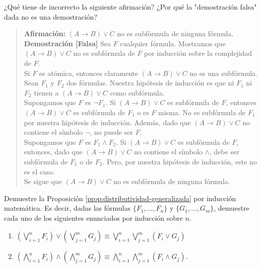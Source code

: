 \message{ !name(main.tex)}\documentclass[12pt,a4paper]{book}
\newcommand{\comillas}[1]{"#1"}
\begin{document}
    \begin{ejercicio}
        ¿Qué tiene de incorrecto la siguiente afirmación? ¿Por qué la \comillas{demostración falsa} dada no es una
        demostración?
        \begin{quote}
            \textbf{Afirmación:} $(A\rightarrow B)\vee C$ no es subfórmula de ninguna fórmula.\\[0.2cm]
            \textbf{Demostración [Falsa]} Sea $F$ cualquier fórmula. Mostramos que $(A\rightarrow B)\vee C$ no es
            subfórmula de $F$ por inducción sobre la complejidad de $F$.\\
            Si $F$ es atómica, entonces claramente $(A\rightarrow B)\vee C$ no es una subfórmula.\\
            Sean $F_{1}$ y $F_{2}$ dos fórmulas. Nuestra hipótesis de inducción es que ni $F_{1}$ ni $F_{2}$ tienen a
            $(A\rightarrow B)\vee C$ como subfórmula.\\
            Supongamos que $F$ es $\neg F_{1}$. Si $(A\rightarrow B)\vee C$ es subfórmula de $F$, entonces
            $(A\rightarrow B)\vee C$ es subfórmula de $F_{1}$ o es $F$ misma. No es subfórmula de $F_{1}$ por nuestra
            hipótesis de inducción. Además, dado que $(A\rightarrow B)\vee C$ no contiene el símbolo $\neg$, no puede ser
            $F$.\\
            Supongamos que $F$ es $F_{1}\wedge F_{2}$. Si $(A\rightarrow B)\vee C$ es subfórmula de $F$, entonces, dado que
            $(A\rightarrow B)\vee C$ no contiene el símbolo $\wedge$, debe ser subfórmula de $F_{1}$ o de $F_{2}$. Pero, por
            nuestra hipótesis de inducción, este no es el caso.\\
            Se sigue que $(A\rightarrow B)\vee C$ no es subfórmula de ninguna fórmula.
        \end{quote}
    \end{ejercicio}

    \begin{ejercicio}\label{ej:prop-distributividad-generalizada}
        Demuestre la Proposición \ref{prop:distributividad-generalizada} por inducción matemática. Es decir, dadas las
        fórmulas $\{F_{1},\dots,F_{n}\}$ y $\{G_{1},\dots,G_{m}\}$, demuestre cada uno de los siguientes enunciados por
        inducción sobre $n$.
        \begin{enumerate}[label=(\alph*)]
            \item $\left(\bigvee_{i=1}^{n}F_{i}\right)\vee\left(\bigvee_{j=1}^{m}G_{j}\right)\equiv
            \bigvee_{i=1}^{n}\bigvee_{j=1}^{m}(F_{i}\vee G_{j})$
            \item $\left(\bigwedge_{i=1}^{n}F_{i}\right)\wedge\left(\bigwedge_{j=1}^{m}G_{j}\right)\equiv
            \bigwedge_{i=1}^{n}\bigwedge_{j=1}^{m}(F_{i}\wedge G_{j})$.
        \end{enumerate}
    \end{ejercicio}
\end{document}
